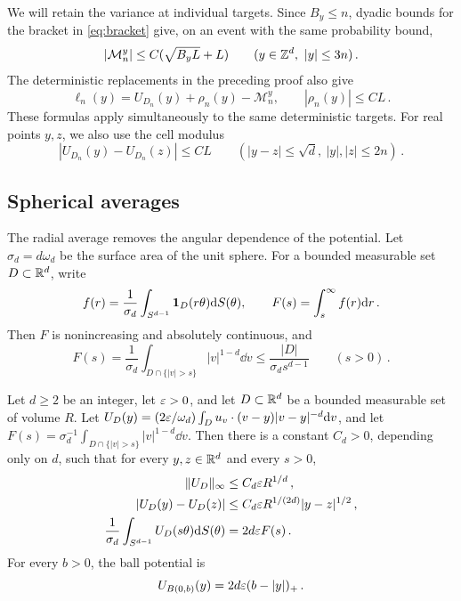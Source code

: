 We will retain the variance at individual targets. Since $B_y\leq n$,
dyadic bounds for the bracket in \eqref{eq:bracket} give, on an event
with the same probability bound,
\begin{equation}\label{eq:localmart}
|\mathcal M_n^y|\leq C(\sqrt{B_yL}+L)
\qquad(y\in\mathbb Z^d,\ |y|\leq3n)\, .
\end{equation}
The deterministic replacements in the preceding proof also give
\begin{equation}\label{eq:pointwise}
\ell_n(y)=U_{D_n}(y)+\rho_n(y)-\mathcal M_n^y ,\qquad
|\rho_n(y)|\leq CL\, .
\end{equation}
These formulas apply simultaneously to the same deterministic targets.
For real points $y,z$, we also use the cell modulus
\begin{equation}\label{eq:cellmodulus}
|U_{D_n}(y)-U_{D_n}(z)|\leq CL
\qquad(|y-z|\leq\sqrt d,\ |y|,|z|\leq2n)\, .
\end{equation}

\subsection{Spherical averages}
The radial average removes the angular dependence of the potential.
Let $\sigma_d=d\omega_d$ be the surface area of the unit sphere.
For a bounded measurable set $D\subset\mathbb R^d$, write
\begin{equation}\label{eq:Fdef}
f(r)=\frac1{\sigma_d}\int_{S^{d-1}}\mathbf 1_D(r\theta)\mathrm d S(\theta) ,
\qquad F(s)=\int_s^\infty f(r)\mathrm d r\, .
\end{equation}
Then $F$ is nonincreasing and absolutely continuous, and
\begin{equation}\label{eq:Fmass}
F(s)=\frac1{\sigma_d}\int_{D\cap\{|v|>s\}}|v|^{1-d}\dd v
\leq\frac{|D|}{\sigma_ds^{d-1}}
\qquad(s>0)\, .
\end{equation}

\begin{lemma}\label{lem:geometry}
Let $d\geq2$ be an integer, let $\varepsilon>0$, and let $D\subset\mathbb R^d$
be a bounded measurable set of volume $R$. Let
$U_D(y)=(2\varepsilon/\omega_d)\int_Du_v\cdot(v-y)|v-y|^{-d}\mathrm d v$,
and let $F(s)=\sigma_d^{-1}\int_{D\cap\{|v|>s\}}|v|^{1-d}\dd v$.
Then there is a constant $C_d>0$, depending only on $d$, such that
for every $y,z\in\mathbb R^d$ and every $s>0$,
\begin{align}
\|U_D\|_\infty&\leq C_d\varepsilon R^{1/d}\, ,\label{eq:potential-bound}\\
|U_D(y)-U_D(z)|&\leq C_d\varepsilon R^{1/(2d)}|y-z|^{1/2}\, ,\label{eq:holder}\\
\frac1{\sigma_d}\int_{S^{d-1}}U_D(s\theta)\mathrm d S(\theta)
&=2d\varepsilon F(s)\, .\label{eq:newton}
\end{align}
For every $b>0$, the ball potential is
\begin{equation}\label{eq:ballpotential}
U_{B(0,b)}(y)=2d\varepsilon(b-|y|)_+\, .
\end{equation}
\end{lemma}

